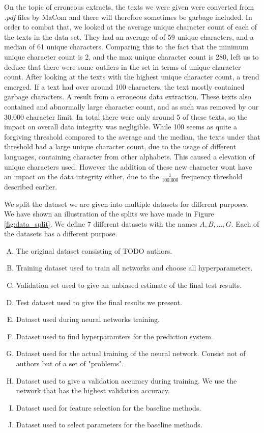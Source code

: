 On the topic of erroneous extracts, the texts we were given were converted from
\textit{.pdf} files by MaCom and there will therefore sometimes be garbage
included. In order to combat that, we looked at the average unique character
count of each of the texts in the data set. They had an average of of 59 unique
characters, and a median of 61 unique characters. Comparing this to the fact
that the minimum unique character count is 2, and the max unique character count
is 280, left us to deduce that there were some outliers in the set in terms of
unique character count. After looking at the texts with the highest unique
character count, a trend emerged. If a text had over around 100 characters,
the text mostly contained garbage characters. A result from a erroneous data
extraction. These texts also contained and abnormally large character count,
and as such was removed by our 30.000 character limit. In total there were only
around 5 of these texts, so the impact on overall data integrity was negligible.
While 100 seems as quite a forgiving threshold compared to the average and the
median, the texts under that threshold had a large unique character count, due
to the usage of different languages, containing character from other alphabets.
This caused a elevation of unique characters used. However the addition of these
new character wont have an impact on the data integrity either, due to the
$\frac{1}{100.000}$ frequency threshold described earlier.


We split the dataset we are given into multiple datasets for different purposes.
We have shown an illustration of the splits we have made in Figure
\ref{fig:data_split}. We define 7 different datasets with the names $A, B,
\dots, G$. Each of the datasets has a different purpose.

\begin{enumerate}[A)]
    \item The original dataset consisting of TODO authors.
    \item Training dataset used to train all networks and choose all
        hyperparameters.
    \item Validation set used to give an unbiased estimate of the final test
        results.
    \item Test dataset used to give the final results we present.
    \item Dataset used during neural networks training.
    \item Dataset used to find hyperparamters for the prediction system.
    \item Dataset used for the actual training of the neural network. Consist
        not of authors but of a set of "problems".
    \item Dataset used to give a validation accuracy during training. We use the
        network that has the highest validation accuracy.
    \item Dataset used for feature selection for the baseline methods.
    \item Dataset used to select parameters for the baseline methods.
\end{enumerate}

